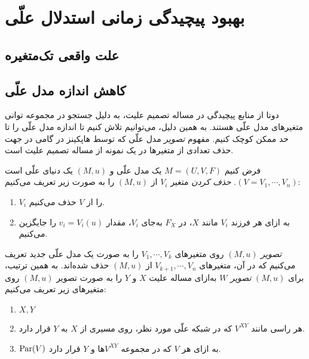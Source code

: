 \section{بهبود پیچیدگی زمانی استدلال علّی}\label{sec:improvements}

\subsection{علت واقعی تک‌متغیره}

\subsection{کاهش اندازه مدل علّی}

دوتا از منابع پیچیدگی در مساله تصمیم علیت،
به دلیل جستجو در مجموعه توانی متغیرهای مدل علّی هستند.
به همین دلیل، می‌توانیم تلاش کنیم تا اندازه مدل علّی را
تا حد ممکن کوچک کنیم. مفهوم
\textit{تصویر}
مدل علّی که توسط هاپکینز در
\cite{hopkins2002strategies}
گامی در جهت حذف تعدادی از متغیرها در
یک نمونه
از مساله تصمیم علیت است.

\begin{definition}\label{def:w-projection}
  فرض کنیم
  $M=(U,V,F)$
  یک مدل علّی و
  $(M,u)$
  یک دنیای علّی است
  $(V={V_1,\cdots,V_n})$.
  \textit{حذف کردن}
  متغیر
  $V_i$
  از
  $(M,u)$
  را به صورت زیر تعریف می‌کنیم:
  \begin{enumerate}[label=(\alph*)]
    \item $V_i$
    را از
    $V$
    حذف می‌کنیم.
    \item
    به ازای هر فرزند
    $V_i$
    مانند
    $X$،
    در
    $F_X$
    به‌جای
    $V_i$،
    مقدار
    $v_i=V_i(u)$
    را جایگزین می‌کنیم.
  \end{enumerate}
  
  \textit{تصویر} $(M,u)$
  روی متغیرهای
  $V_1,\cdots,V_k$
  را به صورت یک مدل علّی جدید تعریف می‌کنیم
  که در آن، متغیرهای
  $V_{k+1},\cdots,V_n$
  از
  $(M,u)$
  حذف شده‌اند.
  به همین ترتیب،
  برای
  $(M,u)$
  \textit{تصویر $W$}
  به‌ازای مساله علیت
  $X$ و $Y$
  را به صورت تصویر
  $(M,u)$
  روی متغیرهای زیر تعریف می‌کنیم:
  \begin{enumerate}[label=(\alph*)]
    \item $X,Y$
    \item هر راسی مانند
    $V^{XY}$
    که در شبکه علّی مورد نظر،
    روی مسیری از
    $X$ به $Y$
    قرار دارد.
    \item $\operatorname{Par}(V)$
    به ازای هر
    $V$
    که در مجموعه
    $V^{XY}$ها
    و $Y$
    قرار دارد.
  \end{enumerate}
\end{definition}

